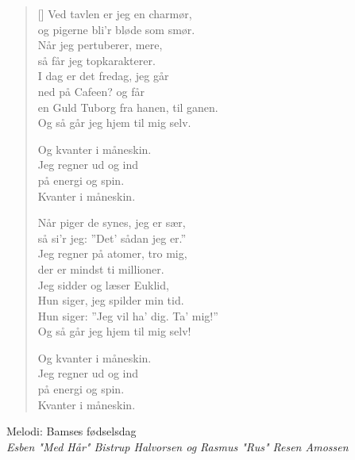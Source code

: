 \begin{multicols}{2}
\settowidth{\versewidth}{Jeg regner på atomer, tro mig,}
\begin{verse}[\versewidth]
Ved tavlen er jeg en charmør,\\
og pigerne bli’r bløde som smør.\\
Når jeg pertuberer, mere,\\
så får jeg topkarakterer.\\
I dag er det fredag, jeg går\\
ned på Cafeen? og får\\
en Guld Tuborg fra hanen, til
ganen.\\
Og så går jeg hjem til mig selv.

Og kvanter i måneskin.\\
Jeg regner ud og ind\\
på energi og spin.\\
Kvanter i måneskin.

Når piger de synes, jeg er sær,\\
så si’r jeg: ”Det’ sådan jeg er.”\\
Jeg regner på atomer, tro mig,\\
der er mindst ti millioner.\\
Jeg sidder og læser Euklid,\\
Hun siger, jeg spilder min tid.\\
Hun siger: ”Jeg vil ha’ dig. Ta’
mig!”\\
Og så går jeg hjem til mig selv!

\lrepeat Og kvanter i måneskin.\\
Jeg regner ud og ind\\
på energi og spin.\\
Kvanter i måneskin.\rrepeat
\end{verse}
\end{multicols}
\newpage

{Melodi: Bamses fødselsdag}\\[.2em]
{\small\itshape Esben "Med Hår" Bistrup Halvorsen og Rasmus "Rus" Resen Amossen}

